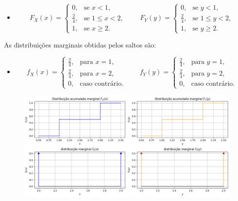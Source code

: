\begin{frame}
	\begin{itemize}
		\item[]
		\[
		F_X(x) =
		\begin{cases}
			0, & \text{se } x < 1, \\
			\frac{2}{4}, & \text{se } 1 \leq x < 2, \\
			1, & \text{se } x \geq 2.
		\end{cases}
		\qquad 
		F_Y(y) =
		\begin{cases}
			0, & \text{se } y < 1, \\
			\frac{2}{4}, & \text{se } 1 \leq y < 2, \\
			1, & \text{se } y \geq 2.
		\end{cases}
		\]
	\end{itemize}
As distribuições marginais obtidas pelos saltos são:
\begin{itemize}
	\item[]
	\[
	f_X(x) =
	\begin{cases}
		\frac{2}{4}, & \text{para } x = 1, \\
		\frac{2}{4}, & \text{para } x = 2, \\
		0, & \text{caso contrário.}
	\end{cases}
\qquad
	f_Y(y) =
	\begin{cases}
		\frac{2}{4}, & \text{para } y = 1, \\
		\frac{2}{4}, & \text{para } y = 2, \\
		0, & \text{caso contrário.}
	\end{cases}
	\]
\end{itemize}


	\begin{figure}[!htb]
	\begin{center}
		\includegraphics[scale=0.3]{marginaisdiscretas.png}
	\end{center}
\end{figure}

\end{frame}



